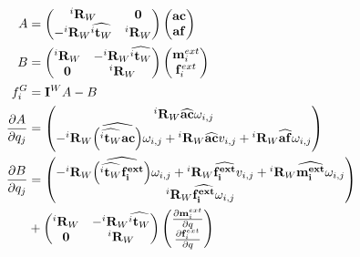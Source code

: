 \begin{align}
  A &=
  \begin{pmatrix}
    {{}^i\mathbf{R}_W} & \mathbf{0} \\
    -{{}^i\mathbf{R}_W}\widehat{{}^i\mathbf{t}_W} & {{}^i\mathbf{R}_W} \\
  \end{pmatrix}
  \begin{pmatrix}
    \mathbf{ac} \\ \mathbf{af}
  \end{pmatrix} \\
  B &=
  \begin{pmatrix}
    {{}^i\mathbf{R}_W} & -{{}^i\mathbf{R}_W}\widehat{{}^i\mathbf{t}_W} \\
    \mathbf{0} & {{}^i\mathbf{R}_W} \\
  \end{pmatrix}
  \begin{pmatrix}
    \mathbf{m}^{ext}_i \\ \mathbf{f}^{ext}_i
  \end{pmatrix} \\
  f^G_i &= \mathbf{I}^W A-B\\
  \frac{\partial A}{\partial q_j} &=
  \begin{pmatrix}
    {}^i\mathbf{R}_W \widehat{\bf ac} \omega_{i,j}\\
    -{{}^i\mathbf{R}_W}\widehat{\left(\widehat{{}^i\mathbf{t}_W}{\bf ac} \right)}\omega_{i,j}
    + {{}^i\mathbf{R}_W}\widehat{\bf ac} v_{i,j} + {}^i\mathbf{R}_W \widehat{\bf af} \omega_{i,j}\\
  \end{pmatrix}
  \\
  \frac{\partial B}{\partial q_j} &=
  \begin{pmatrix}
    - {{}^i\mathbf{R}_W}\widehat{\left(\widehat{{}^i\mathbf{t}_W}\bf \mathbf{f}^{ext}_i \right)}\omega_{i,j}
    + {{}^i\mathbf{R}_W}\widehat{\bf \mathbf{f}^{ext}_i} v_{i,j} + {}^i\mathbf{R}_W \widehat{\bf \mathbf{m}^{ext}_i} \omega_{i,j}\\
    {}^i\mathbf{R}_W \widehat{\bf \mathbf{f}^{ext}_i} \omega_{i,j}\\
  \end{pmatrix}
  \\&+
  \begin{pmatrix}
    {{}^i\mathbf{R}_W} & -{{}^i\mathbf{R}_W}\widehat{{}^i\mathbf{t}_W} \\
    \mathbf{0} & {{}^i\mathbf{R}_W} \\
  \end{pmatrix}
  \begin{pmatrix}
    \frac{\partial \mathbf{m}^{ext}_i}{\partial q} \\ \frac{\partial \mathbf{f}^{ext}_i}{\partial q}
  \end{pmatrix}
\end{align}

